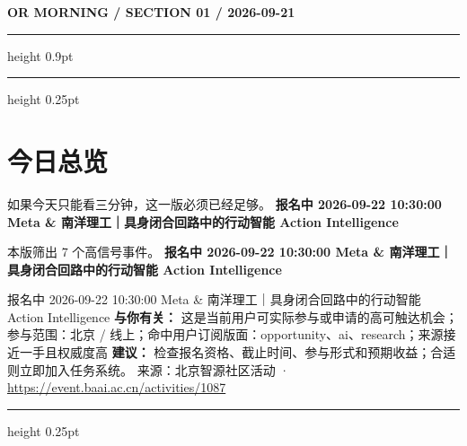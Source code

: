 \documentclass[10.5pt]{ctexart}
\begin{document}
{\small\bfseries OR MORNING / SECTION 01 / 2026-09-21}
\vspace{2mm}
\hrule height 0.9pt
\vspace{1.5mm}
\hrule height 0.25pt
\vspace{4mm}
\section*{今日总览}
{\color{ormuted} 如果今天只能看三分钟，这一版必须已经足够。}
\vspace{2mm}
{\fontsize{25}{29}\selectfont\bfseries 报名中 2026-09-22 10:30:00 Meta \& 南洋理工｜具身闭合回路中的行动智能 Action Intelligence}\par
\vspace{2mm}
{\large 本版筛出 7 个高信号事件。}
\vspace{3mm}
{\Large\bfseries 报名中 2026-09-22 10:30:00 Meta \& 南洋理工｜具身闭合回路中的行动智能 Action Intelligence}\par
报名中 2026-09-22 10:30:00 Meta \& 南洋理工｜具身闭合回路中的行动智能 Action Intelligence
\textbf{与你有关：} 这是当前用户可实际参与或申请的高可触达机会；参与范围：北京 / 线上；命中用户订阅版面：opportunity、ai、research；来源接近一手且权威度高
\textbf{建议：} 检查报名资格、截止时间、参与形式和预期收益；合适则立即加入任务系统。
{\footnotesize\color{ormuted} 来源：北京智源社区活动 · \url{https://event.baai.ac.cn/activities/1087}}
\vspace{3mm}
\hrule height 0.25pt
\vspace{3mm}
\end{document}
